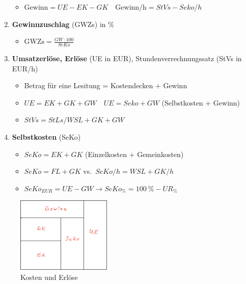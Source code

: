 \begin{enumerate}
  \begin{itemize}
  \item
    $\boxed{\text{Gewinn} = UE - EK - GK} \quad \boxed{\text{Gewinn/h} = StVs - Seko/h}$
  \end{itemize}
\item
  \textbf{Gewinnzuschlag} (GWZs) in \%

  \begin{itemize}
  \item
    $\boxed{\text{GWZs} = \frac{GW \cdot 100}{SeKo}}$
  \end{itemize}
\item
  \textbf{Umsatzerlöse, Erlöse} (UE in EUR), Stundenverrechnungssatz
  (StVs in EUR/h)

  \begin{itemize}
  \item
    Betrag für eine Lesitung = Kostendecken + Gewinn
  \item
    $\boxed{UE = EK + GK + GW} \quad \boxed{UE = Seko + GW}$
    (Selbstkosten + Gewinn)
  \item
    $\boxed{StVs = StLs/WSL + GK + GW}$
  \end{itemize}
\item
  \textbf{Selbstkosten} (SeKo)

  \begin{itemize}
  \item
    $\boxed{SeKo = EK + GK}$ (Einzelkosten + Gemeinkosten)
  \item
    $\boxed{SeKo = FL + GK}$ vs.~$\boxed{SeKo/h = WSL + GK/h}$
  \item
    $\boxed{SeKo_{EUR} = UE - GW} \to \boxed{SeKo_\% = 100~\% - UR_\%}$
  \end{itemize}
\end{enumerate}

\begin{figure}[!ht]%
\centering
\includegraphics[width=0.4\textwidth]{images/Skizze/02_Umsatzerloese_Skizze.pdf}
\caption{Kosten und Erlöse}
\end{figure}

